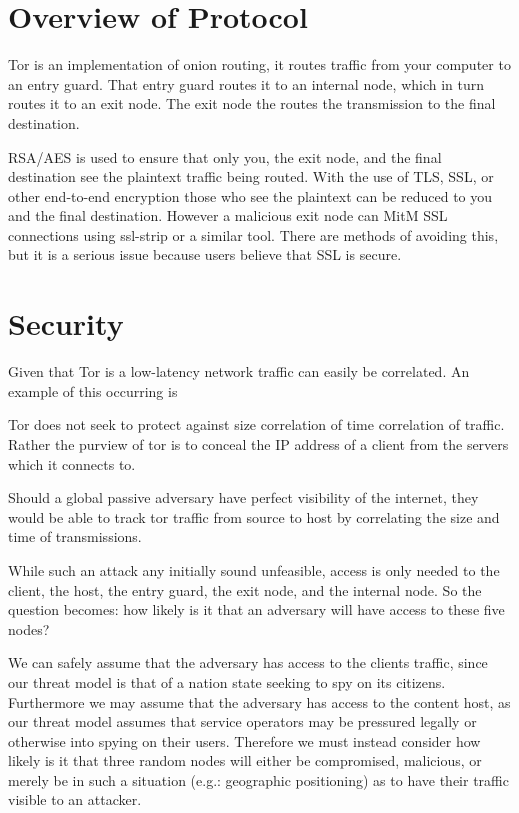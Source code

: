 \section{Overview of Protocol}
Tor is an implementation of onion routing, it routes traffic from your computer
to an entry guard. That entry guard routes it to an internal node, which in turn
routes it to an exit node. The exit node the routes the transmission to the
final destination.

RSA/AES is used to ensure that only you, the exit node, and the final
destination see the plaintext traffic being routed. With the use of TLS, SSL, or
other end-to-end encryption those who see the plaintext can be reduced to you
and the final destination. However a malicious exit node can MitM SSL connections
using ssl-strip or a similar tool. There are methods of avoiding this, but it is
a serious issue because users believe that SSL is secure.

\section{Security}
Given that Tor is a low-latency network traffic can easily be correlated. An
example of this occurring is 

Tor does not seek to protect against size correlation of time correlation of
traffic. Rather the purview of tor is to conceal the IP address of a client from
the servers which it connects to.

Should a global passive adversary have perfect visibility of the internet, they
would be able to track tor traffic from source to host by correlating the size
and time of transmissions.

While such an attack any initially sound unfeasible, access is only needed to
the client, the host, the entry guard, the exit node, and the internal node.
So the question becomes: how likely is it that an adversary will have access to
these five nodes?

We can safely assume that the adversary has access to the clients traffic, since
our threat model is that of a nation state seeking to spy on its citizens.
Furthermore we may assume that the adversary has access to the content host, as
our threat model assumes that service operators may be pressured legally or
otherwise into spying on their users. Therefore we must instead consider how
likely is it that three random nodes will either be compromised, malicious, or
merely be in such a situation (e.g.: geographic positioning) as to have their
traffic visible to an attacker.

